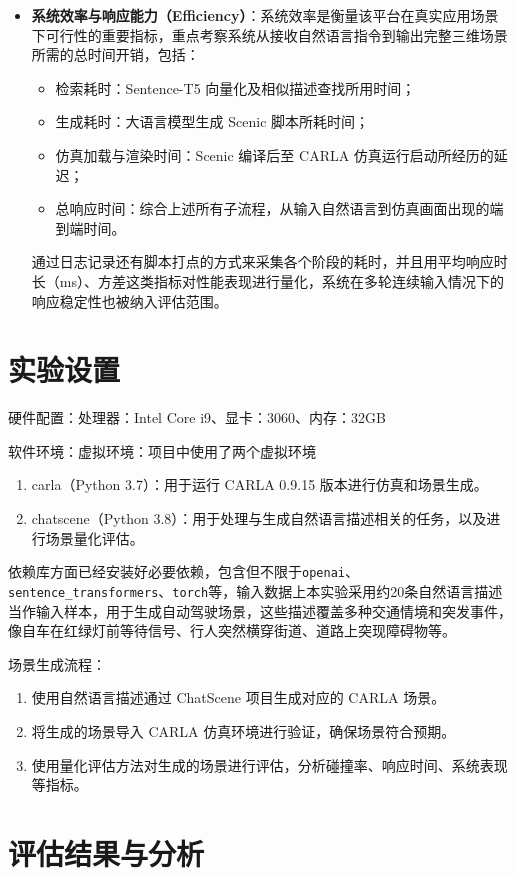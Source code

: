 \begin{itemize}
	\item \textbf{系统效率与响应能力（Efficiency）}：系统效率是衡量该平台在真实应用场景下可行性的重要指标，重点考察系统从接收自然语言指令到输出完整三维场景所需的总时间开销，包括：
	\begin{itemize}
		\item 检索耗时：Sentence-T5 向量化及相似描述查找所用时间；
		\item 生成耗时：大语言模型生成 Scenic 脚本所耗时间；
		\item 仿真加载与渲染时间：Scenic 编译后至 CARLA 仿真运行启动所经历的延迟；
		\item 总响应时间：综合上述所有子流程，从输入自然语言到仿真画面出现的端到端时间。
	\end{itemize}
通过日志记录还有脚本打点的方式来采集各个阶段的耗时，并且用平均响应时长（ms）、方差这类指标对性能表现进行量化，系统在多轮连续输入情况下的响应稳定性也被纳入评估范围。
\end{itemize}

\section{实验设置}
硬件配置：处理器：Intel Core i9、显卡：3060、内存：32GB

软件环境：虚拟环境：项目中使用了两个虚拟环境
\begin{enumerate}
	\item carla（Python 3.7）：用于运行 CARLA 0.9.15 版本进行仿真和场景生成。
	\item chatscene（Python 3.8）：用于处理与生成自然语言描述相关的任务，以及进行场景量化评估。
\end{enumerate}
依赖库方面已经安装好必要依赖，包含但不限于\texttt{openai}、\texttt{sentence\_transformers}、\texttt{torch}等，输入数据上本实验采用约20条自然语言描述当作输入样本，用于生成自动驾驶场景，这些描述覆盖多种交通情境和突发事件，像自车在红绿灯前等待信号、行人突然横穿街道、道路上突现障碍物等。

场景生成流程：
\begin{enumerate}
	\item 使用自然语言描述通过 ChatScene 项目生成对应的 CARLA 场景。
	\item 将生成的场景导入 CARLA 仿真环境进行验证，确保场景符合预期。
	\item 使用量化评估方法对生成的场景进行评估，分析碰撞率、响应时间、系统表现等指标。
\end{enumerate}

\section{评估结果与分析}

